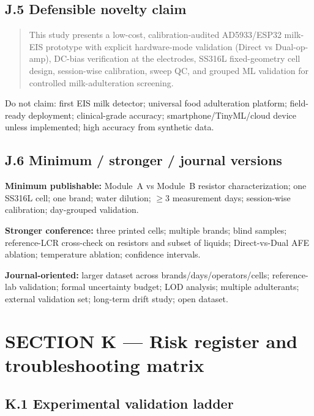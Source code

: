 \documentclass[11pt,a4paper]{article}
\begin{document}
\subsection{J.5 Defensible novelty claim}

\begin{quote}
This study presents a low-cost, calibration-audited AD5933/ESP32 milk-EIS prototype with explicit hardware-mode validation (Direct vs Dual-op-amp), DC-bias verification at the electrodes, SS316L fixed-geometry cell design, session-wise calibration, sweep QC, and grouped ML validation for controlled milk-adulteration screening.
\end{quote}

Do not claim: first EIS milk detector; universal food adulteration platform; field-ready deployment; clinical-grade accuracy; smartphone/TinyML/cloud device unless implemented; high accuracy from synthetic data.

\subsection{J.6 Minimum / stronger / journal versions}

\textbf{Minimum publishable:} Module~A vs Module~B resistor characterization; one SS316L cell; one brand; water dilution; $\geq 3$ measurement days; session-wise calibration; day-grouped validation.

\textbf{Stronger conference:} three printed cells; multiple brands; blind samples; reference-LCR cross-check on resistors and subset of liquids; Direct-vs-Dual AFE ablation; temperature ablation; confidence intervals.

\textbf{Journal-oriented:} larger dataset across brands/days/operators/cells; reference-lab validation; formal uncertainty budget; LOD analysis; multiple adulterants; external validation set; long-term drift study; open dataset.

\section{SECTION K --- Risk register and troubleshooting matrix}
\label{sec:K}

\subsection{K.1 Experimental validation ladder}
\end{document}
